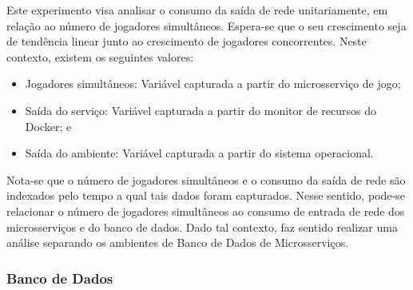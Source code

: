 Este experimento visa analisar o consumo da saída de rede unitariamente, em relação ao número de jogadores simultâneos.
%
Espera-se que o seu crescimento seja de tendência linear junto ao crescimento de jogadores concorrentes.
%
Neste contexto, existem os seguintes valores:

\begin{itemize}
    \item Jogadores simultâneos: Variável capturada a partir do microsserviço de jogo;
    \item Saída do serviço: Variável capturada a partir do monitor de recursos do Docker; e
    \item Saída do ambiente: Variável capturada a partir do sistema operacional.
\end{itemize}

Nota-se que o número de jogadores simultâneos e o consumo da saída de rede são indexados pelo tempo a qual tais dados foram capturados.
%
Nesse sentido, pode-se relacionar o número de jogadores simultâneos ao consumo de entrada de rede dos microsserviços e do banco de dados.
%
Dado tal contexto, faz sentido realizar uma análise separando os ambientes de Banco de Dados de Microsserviços.

\subsubsection{Banco de Dados}

